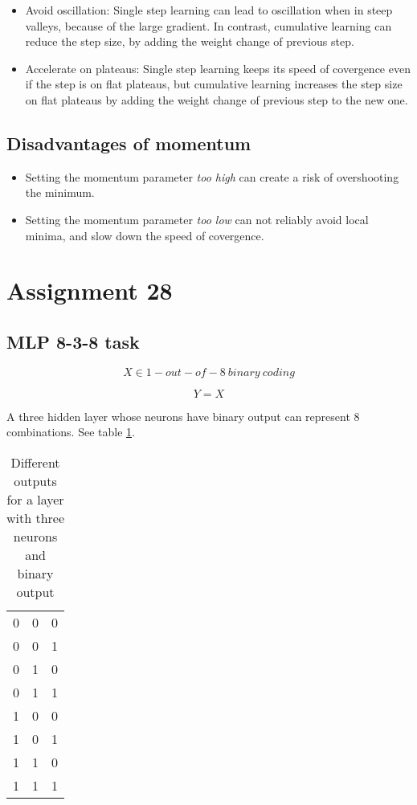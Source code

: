 \documentclass[12pt]{article}
\begin{document}
\begin{itemize}

    \item Avoid oscillation: Single step learning can lead to oscillation when in steep
valleys, because of the large gradient. In contrast, cumulative learning can
reduce the step size, by adding the weight change of previous step.

    \item Accelerate on plateaus: Single step learning keeps its speed of covergence even
if the step is on flat plateaus, but cumulative learning increases the step
size on flat plateaus by adding the weight change of previous step to the new
one.

\end{itemize}

\subsection{Disadvantages of momentum}

\begin{itemize}

    \item Setting the momentum parameter \textit{too high} can create a risk of overshooting the
minimum.

    \item Setting the momentum parameter \textit{too low} can not reliably avoid local minima, and
slow down the speed of covergence.

\end{itemize}
\newpage

\section{Assignment 28}

\subsection{MLP 8-3-8 task}

$$ X \in 1-out-of-8\:binary\:coding $$

$$ Y = X $$

A three hidden layer whose neurons have binary output can represent 8
combinations. See table \ref{comb}.

\begin{table}[H]
    \centering
    \begin{tabular}{l c r}
        0& 0 &0 \\
        0& 0 &1 \\
        0& 1 &0 \\
        0& 1 &1 \\
        1& 0 &0 \\
        1& 0 &1 \\
        1& 1 &0 \\
        1& 1 &1 \\
    \end{tabular}
    \caption{Different outputs for a layer with three neurons and binary output}
    \label{comb}
\end{table}
\end{document}

